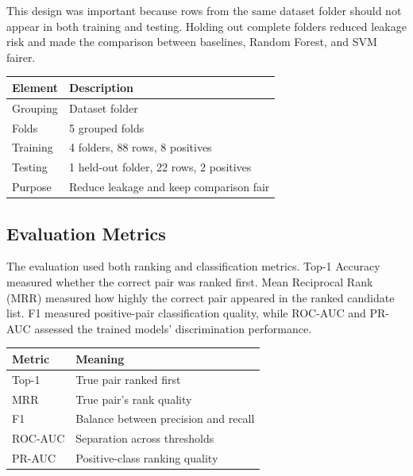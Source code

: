 \documentclass[10pt,a4paper]{article}
\begin{document}
\begin{multicols}{2}
This design was important because rows from the same dataset folder should not appear in both training and testing. Holding out complete folders reduced leakage risk and made the comparison between baselines, Random Forest, and SVM fairer.

\begin{center}
\label{tab:grouped-evaluation}
\renewcommand{\arraystretch}{1.15}
\footnotesize
\begin{tabularx}{\columnwidth}{lY}
\toprule
{}\textbf{Element} & \textbf{Description} \\
\midrule
Grouping & Dataset folder \\
Folds & 5 grouped folds \\
Training & 4 folders, 88 rows, 8 positives \\
Testing & 1 held-out folder, 22 rows, 2 positives \\
Purpose & Reduce leakage and keep comparison fair \\
\bottomrule
\end{tabularx}
\end{center}

\subsection{Evaluation Metrics}

The evaluation used both ranking and classification metrics. Top-1 Accuracy measured whether the correct pair was ranked first. Mean Reciprocal Rank (MRR) measured how highly the correct pair appeared in the ranked candidate list. F1 measured positive-pair classification quality, while ROC-AUC and PR-AUC assessed the trained models' discrimination performance.

\begin{center}
\label{tab:metrics}
\renewcommand{\arraystretch}{1.15}
\footnotesize
\begin{tabularx}{\columnwidth}{lY}
\toprule
{}\textbf{Metric} & \textbf{Meaning} \\
\midrule
Top-1 & True pair ranked first \\
MRR & True pair's rank quality \\
F1 & Balance between precision and recall \\
ROC-AUC & Separation across thresholds \\
PR-AUC & Positive-class ranking quality \\
\bottomrule
\end{tabularx}
\end{center}


\end{multicols}
\end{document}
